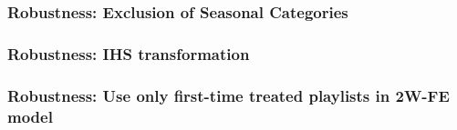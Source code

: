 \documentclass[8pt]{beamer}
\begin{document}
    \begin{frame}
\label{rob:seasonal}
        \frametitle{Robustness: Exclusion of Seasonal Categories}
        
        

        \vfill
\begin{center}
\hyperlink{rob:overview}{}
\end{center}

        
        \end{frame}
    
\begin{frame}
\label{rob:ihs}
\frametitle{Robustness: IHS transformation}        


        
\vfill
\begin{center}
\hyperlink{rob:overview}{}
\end{center}
     
\end{frame}

\begin{frame}
\label{rob:firsttime}
         \frametitle{Robustness: Use only first-time treated playlists in 2W-FE model}

\begin{center}
\hyperlink{rob:overview}{}
\end{center}


 
    
\end{frame}
    
\end{document}
